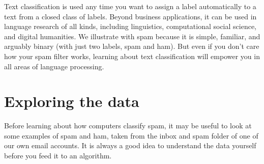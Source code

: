Text classification is used any time you want to assign a label  automatically to a text from a closed class of labels.  Beyond business applications, it can be used in language research of all kinds, including linguistics, computational social science, and digital humanities.  We illustrate with spam because it is simple, familiar, and arguably binary (with just two labels, spam and ham). But even if you don't care how your spam filter works, learning about text classification will empower you in all areas of language processing.


\section{Exploring the data} 

Before learning about how computers classify spam, it may be useful to look at some examples of spam and ham, taken from the inbox and spam folder of one of our own email accounts.  It is always a good idea to understand the data yourself before you feed it to an algorithm.

